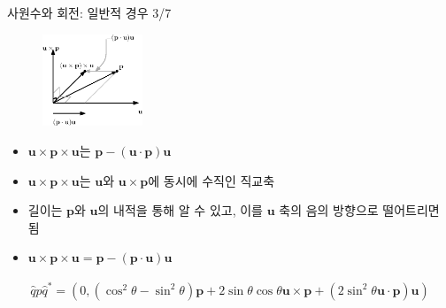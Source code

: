 \begin{frame}[fragile]{사원수와 회전: 일반적 경우 3/7}

\begin{figure}
    \includegraphics[width=3cm]{Math_quaternion/uxpxu.eps}
\end{figure}

\begin{itemize}
\item $\mathbf u \times \mathbf p \times \mathbf u$는 $\mathbf p - (\mathbf u \cdot \mathbf p) \mathbf u$
\item $\mathbf u \times \mathbf p \times \mathbf u$는 $\mathbf u$와 $\mathbf u \times \mathbf p$에 동시에 수직인 직교축
\item 길이는 $\mathbf p$와 $\mathbf u$의 내적을 통해 알 수 있고, 이를 $\mathbf u$ 축의 음의 방향으로 떨어트리면 됨
\item $\mathbf u \times \mathbf p \times \mathbf u = \mathbf p - (\mathbf p \cdot \mathbf u) \mathbf u$
\end{itemize}

\begin{eqnarray}\nonumber
\hat q \hat p \hat q^* =  ( 0, (\cos^2 \theta - \sin^2 \theta ) \mathbf p + 2 \sin \theta \cos \theta \mathbf u \times \mathbf p + (2 \sin^2 \theta \mathbf u \cdot \mathbf p) \mathbf u ) \nonumber
\end{eqnarray}

\end{frame}

